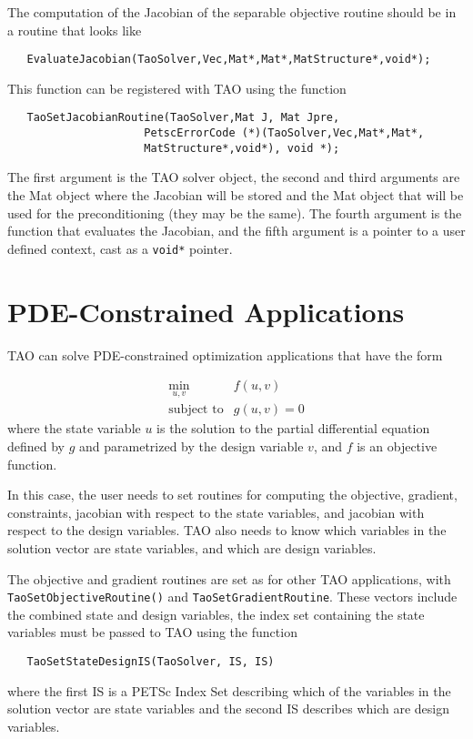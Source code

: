 The computation of the Jacobian of the separable objective routine 
should be in a routine that looks like
\begin{verbatim}
   EvaluateJacobian(TaoSolver,Vec,Mat*,Mat*,MatStructure*,void*);
\end{verbatim}
This function can be registered with TAO using the function
\begin{verbatim}
   TaoSetJacobianRoutine(TaoSolver,Mat J, Mat Jpre,
                     PetscErrorCode (*)(TaoSolver,Vec,Mat*,Mat*,
                     MatStructure*,void*), void *);
\end{verbatim}
The first argument is the TAO solver object, the second and third arguments
are the Mat object where the Jacobian will be stored and the Mat object
that will be used for the preconditioning (they may be the same). The fourth 
argument is the function that evaluates the Jacobian, 
and the fifth argument is a pointer to a user defined context,
cast as a {\tt void*} pointer.

\section{PDE-Constrained Applications}\label{sec:pde_applications}
TAO can solve PDE-constrained optimization applications 
that have the form

\[
\begin{array}{ll}
\displaystyle \min_{u,v} & f(u,v) \\
\mbox{subject to} & g(u,v) = 0
\end{array}
\]
where the state variable $u$ is the solution to the partial differential 
equation defined by $g$ and parametrized by the design variable $v$, and 
$f$ is an objective function.  


In this case, the user needs to set routines for computing the objective,
gradient, constraints, jacobian with respect to the state variables, 
and jacobian with
respect to the design variables.  TAO also needs to know which variables
in the solution vector are state variables, and which are design variables.

The objective and gradient routines are set as for other TAO applications,
with {\tt Tao\-Set\-Object\-ive\-Routine()} and {\tt Tao\-Set\-Gradient\-Routine}.
These vectors include the combined state and design variables, the index set
containing the state variables must be passed to TAO using the function
\begin{verbatim}
   TaoSetStateDesignIS(TaoSolver, IS, IS)
\end{verbatim}
where the first IS is a PETSc Index Set describing which of the variables in the 
solution vector are state variables and the second IS describes which are
design variables.

